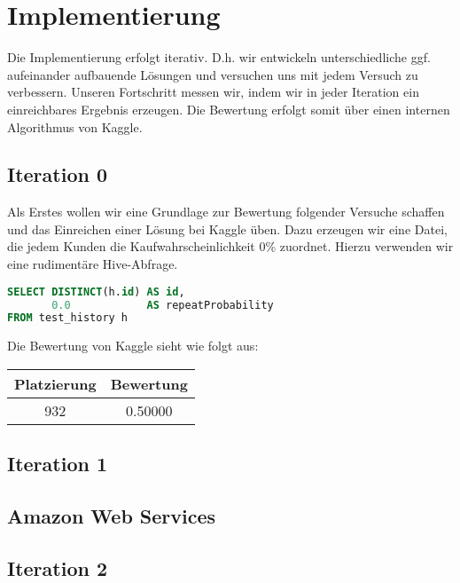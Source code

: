 \section{Implementierung}

Die Implementierung erfolgt iterativ. D.h. wir entwickeln unterschiedliche ggf. aufeinander aufbauende Lösungen
und versuchen uns mit jedem Versuch zu verbessern. Unseren Fortschritt messen wir, indem wir in jeder
Iteration ein einreichbares Ergebnis erzeugen. Die Bewertung erfolgt somit über einen internen Algorithmus
von Kaggle.

\subsection{Iteration 0}

Als Erstes wollen wir eine Grundlage zur Bewertung folgender Versuche schaffen und das Einreichen einer
Lösung bei Kaggle üben. Dazu erzeugen wir eine Datei, die jedem Kunden die Kaufwahrscheinlichkeit 0\%
zuordnet. Hierzu verwenden wir eine rudimentäre Hive-Abfrage.

\begin{lstlisting}[language=SQL]
SELECT DISTINCT(h.id) AS id, 
       0.0            AS repeatProbability 
FROM test_history h
\end{lstlisting}

Die Bewertung von Kaggle sieht wie folgt aus:

\begin{tabular}{|c|c|}
	\hline \textbf{Platzierung} & \textbf{Bewertung} \\ 
	\hline 932 & 0.50000  \\ 
	\hline 
\end{tabular}

\subsection{Iteration 1}
\subsection{Amazon Web Services}
\subsection{Iteration 2}
